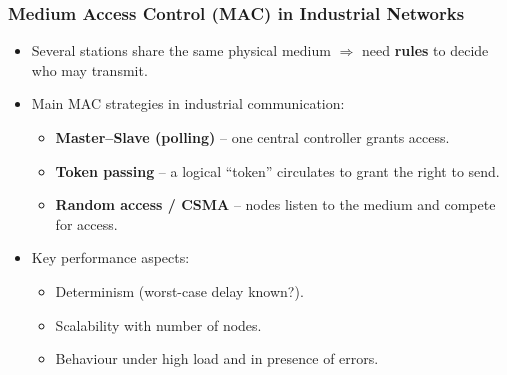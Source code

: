 \begin{frame}
	\frametitle{Medium Access Control (MAC) in Industrial Networks}
	\small
	\begin{itemize}
		\item Several stations share the same physical medium $\Rightarrow$ need \textbf{rules} to decide who may transmit.
		\item Main MAC strategies in industrial communication:
		\begin{itemize}
			\item \textbf{Master--Slave (polling)} – one central controller grants access.
			\item \textbf{Token passing} – a logical “token” circulates to grant the right to send.
			\item \textbf{Random access / CSMA} – nodes listen to the medium and compete for access.
		\end{itemize}
		\item Key performance aspects:
		\begin{itemize}
			\item Determinism (worst-case delay known?).
			\item Scalability with number of nodes.
			\item Behaviour under high load and in presence of errors.
		\end{itemize}
	\end{itemize}
\end{frame}

